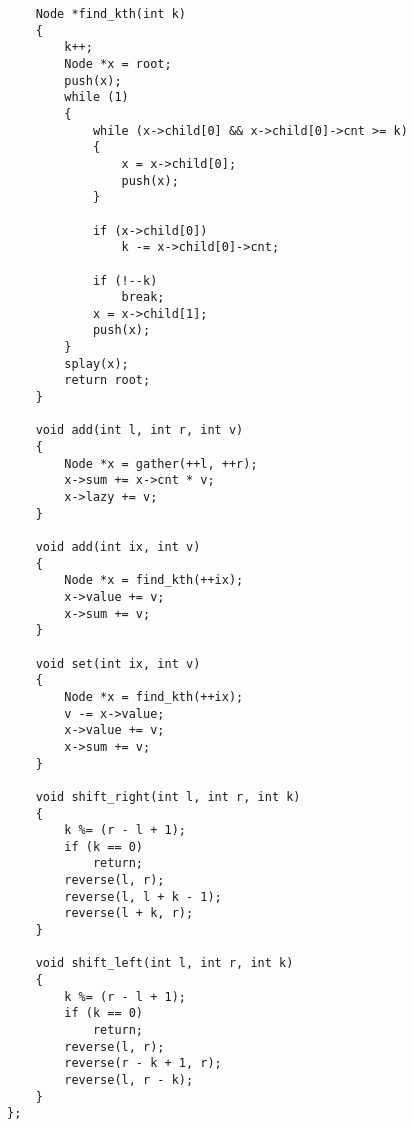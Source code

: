 \documentclass[landscape, 8pt, a4paper, oneside, twocolumn]{extarticle}
\begin{document}
\begin{verbatim}
    Node *find_kth(int k)
    {
        k++;
        Node *x = root;
        push(x);
        while (1)
        {
            while (x->child[0] && x->child[0]->cnt >= k)
            {
                x = x->child[0];
                push(x);
            }

            if (x->child[0])
                k -= x->child[0]->cnt;

            if (!--k)
                break;
            x = x->child[1];
            push(x);
        }
        splay(x);
        return root;
    }

    void add(int l, int r, int v)
    {
        Node *x = gather(++l, ++r);
        x->sum += x->cnt * v;
        x->lazy += v;
    }

    void add(int ix, int v)
    {
        Node *x = find_kth(++ix);
        x->value += v;
        x->sum += v;
    }

    void set(int ix, int v)
    {
        Node *x = find_kth(++ix);
        v -= x->value;
        x->value += v;
        x->sum += v;
    }

    void shift_right(int l, int r, int k)
    {
        k %= (r - l + 1);
        if (k == 0)
            return;
        reverse(l, r);
        reverse(l, l + k - 1);
        reverse(l + k, r);
    }

    void shift_left(int l, int r, int k)
    {
        k %= (r - l + 1);
        if (k == 0)
            return;
        reverse(l, r);
        reverse(r - k + 1, r);
        reverse(l, r - k);
    }
};
\end{verbatim}
\end{document}
